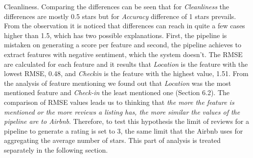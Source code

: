 Cleanliness. Comparing the differences can be seen that for \textit{Cleanliness} the differences are mostly 0.5 stars but for \textit{Accuracy} difference of 1 stars prevails.  From the observation it is noticed that differences can reach in quite a few cases higher than 1.5, which has two possible explanations. First, the pipeline is mistaken on generating a score per feature and second, the pipeline achieves to extract features with negative sentiment, which the system doesn't. The RMSE are calculated for each feature and it results that \textit{Location} is the feature with the lowest RMSE, 0.48, and \textit{Checkin} is the feature with the highest value, 1.51. From the analysis of feature mentioning we found out that \textit{Location} was the most mentioned feature and \textit{Check-in} the least mentioned one (Section 6.2). The comparison of RMSE values leads us to thinking that \textit{the more the feature is mentioned or the more reviews a listing has, the more similar the values of the pipeline are to Airbnb}. Therefore, to test this hypothesis the limit of reviews for a pipeline to generate a rating is set to 3, the same limit that the Airbnb uses for aggregating the average number of stars. This part of analysis is treated separately in the following section.
